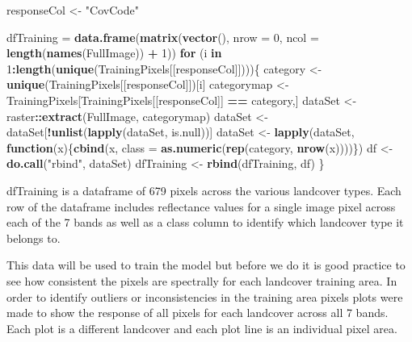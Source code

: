 \documentclass[]{article}
\newenvironment{Shaded}{\begin{snugshade}}{\end{snugshade}}
\newcommand{\KeywordTok}[1]{\textcolor[rgb]{0.13,0.29,0.53}{\textbf{#1}}}
\newcommand{\DataTypeTok}[1]{\textcolor[rgb]{0.13,0.29,0.53}{#1}}
\newcommand{\DecValTok}[1]{\textcolor[rgb]{0.00,0.00,0.81}{#1}}
\newcommand{\StringTok}[1]{\textcolor[rgb]{0.31,0.60,0.02}{#1}}
\newcommand{\ControlFlowTok}[1]{\textcolor[rgb]{0.13,0.29,0.53}{\textbf{#1}}}
\newcommand{\OperatorTok}[1]{\textcolor[rgb]{0.81,0.36,0.00}{\textbf{#1}}}
\newcommand{\NormalTok}[1]{#1}
\begin{document}
\begin{Shaded}
\begin{Highlighting}[]
\NormalTok{responseCol <-}\StringTok{ "CovCode"}

\NormalTok{dfTraining =}\StringTok{ }\KeywordTok{data.frame}\NormalTok{(}\KeywordTok{matrix}\NormalTok{(}\KeywordTok{vector}\NormalTok{(), }\DataTypeTok{nrow =} \DecValTok{0}\NormalTok{, }\DataTypeTok{ncol =} \KeywordTok{length}\NormalTok{(}\KeywordTok{names}\NormalTok{(FullImage)) }\OperatorTok{+}\StringTok{ }\DecValTok{1}\NormalTok{))   }
\ControlFlowTok{for}\NormalTok{ (i }\ControlFlowTok{in} \DecValTok{1}\OperatorTok{:}\KeywordTok{length}\NormalTok{(}\KeywordTok{unique}\NormalTok{(TrainingPixels[[responseCol]])))\{}
\NormalTok{  category <-}\StringTok{ }\KeywordTok{unique}\NormalTok{(TrainingPixels[[responseCol]])[i]}
\NormalTok{  categorymap <-}\StringTok{ }\NormalTok{TrainingPixels[TrainingPixels[[responseCol]] }\OperatorTok{==}\StringTok{ }\NormalTok{category,]}
\NormalTok{  dataSet <-}\StringTok{ }\NormalTok{raster}\OperatorTok{::}\KeywordTok{extract}\NormalTok{(FullImage, categorymap)}
\NormalTok{  dataSet <-}\StringTok{ }\NormalTok{dataSet[}\OperatorTok{!}\KeywordTok{unlist}\NormalTok{(}\KeywordTok{lapply}\NormalTok{(dataSet, is.null))]}
\NormalTok{  dataSet <-}\StringTok{ }\KeywordTok{lapply}\NormalTok{(dataSet, }\ControlFlowTok{function}\NormalTok{(x)\{}\KeywordTok{cbind}\NormalTok{(x, }\DataTypeTok{class =} \KeywordTok{as.numeric}\NormalTok{(}\KeywordTok{rep}\NormalTok{(category, }\KeywordTok{nrow}\NormalTok{(x))))\})}
\NormalTok{  df <-}\StringTok{ }\KeywordTok{do.call}\NormalTok{(}\StringTok{"rbind"}\NormalTok{, dataSet)}
\NormalTok{  dfTraining <-}\StringTok{ }\KeywordTok{rbind}\NormalTok{(dfTraining, df)}
\NormalTok{\}}
\end{Highlighting}
\end{Shaded}

dfTraining is a dataframe of 679 pixels across the various landcover
types. Each row of the dataframe includes reflectance values for a
single image pixel across each of the 7 bands as well as a class column
to identify which landcover type it belongs to.

This data will be used to train the model but before we do it is good
practice to see how consistent the pixels are spectrally for each
landcover training area. In order to identify outliers or
inconsistencies in the training area pixels plots were made to show the
response of all pixels for each landcover across all 7 bands. Each plot
is a different landcover and each plot line is an individual pixel area.
\end{document}
